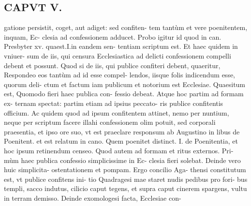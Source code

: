 \documentclass{article}
\begin{document}
\begin{pages}
\section*{CAPVT  V. }
\marginpar{[ p.323 ]}\pstart gatione persistit, coget, aut adiget: sed confiten- tem tantùm et vere poenitentem, inquam, Ec- clesia ad confessionem adducet. Probo igitur id quod in can. Presbyter xv. quaest.I.in eandem sen- tentiam scriptum est. Et haec quidem in vniuer- sum de iis, qui censura Ecclesiastica ad delicti confessionem compelli debent et possunt. Quod si de iis, qui publice confiteri debent, quaeritur, Respondeo eos tantùm ad id esse compel- lendos, iisque folis indicendum esse, quorum deli- ctum et factum iam publicum et notorium est Ecclesiae.  \pend\pstart Quaesitum est, Quomodo fieri haec publica con- fessio debeat. Atque hoc partim ad formam ex- ternam spectat: partim etiam ad ipsius peccato- ris publice confitentis officium. Ac quidem quod ad ipsum confitentem attinet, nemo per nuntium, neque per scriptum facere illahi confessionem olim potuit, sed corporali praesentia, et ipso ore suo, vt est praeclare responsum ab Augustino in libus  de Poenitent. et est relatum in cano. Quem poenitet distinct. I. de Poenitentia, et hoc ipsum retinendum censeo.  \pend\pstart Quod autem ad formam et ritus externos. Pri- mùm haec publica confessio simplicissime in Ec- clesia fieri solebat. Deinde vero huic simplicita- ostentationem et pompam. Ergo concilio Aga- thensi constitutum est, vt publice confitens ini- tio Quadragesi mae staret nudis pedibus pro fori- bus templi, sacco indutus, cilicio caput tegens, et supra caput cinerem spargens, vultu in terram demisso. Deinde exomologesi facta, Ecclesiae con-  \pend

\end{pages}
\end{document}
